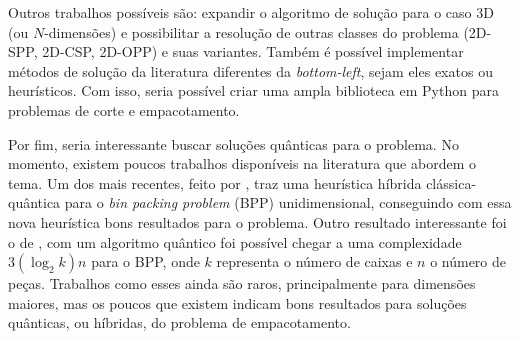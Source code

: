 Outros trabalhos possíveis são: expandir o algoritmo de solução para o caso 3D (ou $N$-dimensões) e
possibilitar a resolução de outras classes do problema (2D-SPP, 2D-CSP, 2D-OPP) e suas variantes.
Também é possível implementar métodos de solução da literatura diferentes da \textit{bottom-left},
sejam eles exatos ou heurísticos.
Com isso, seria possível criar uma ampla biblioteca em Python para problemas de corte e empacotamento.

Por fim, seria interessante buscar soluções quânticas para o problema.
No momento, existem poucos trabalhos disponíveis na literatura que abordem o tema.
Um dos mais recentes, feito por , traz uma heurística híbrida
clássica-quântica para o \textit{bin packing problem} (BPP) unidimensional, conseguindo com essa
nova heurística bons resultados para o problema.
Outro resultado interessante foi o de , com um algoritmo quântico
foi possível chegar a uma complexidade $3(\log_2 k)n$ para o BPP, onde $k$ representa o número de
caixas e $n$ o número de peças.
Trabalhos como esses ainda são raros, principalmente para dimensões maiores, mas os poucos que
existem indicam bons resultados para soluções quânticas, ou híbridas, do problema de empacotamento.
